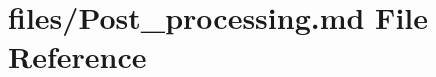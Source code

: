 \hypertarget{Post__processing_8md}{}\section{files/\+Post\+\_\+processing.md File Reference}
\label{Post__processing_8md}
